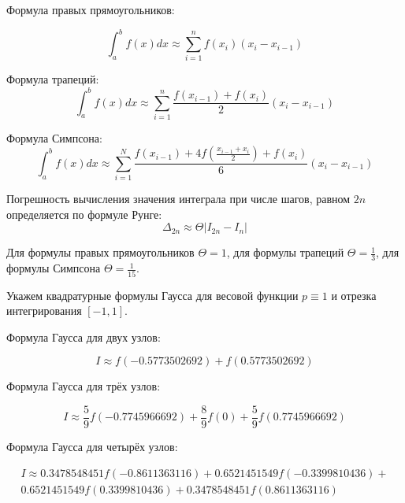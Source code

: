 \documentclass[12pt, a4paper]{article}
\begin{document}
Формула правых прямоугольников:

\begin{equation}
	\int_a^bf(x)dx \approx \sum_{i = 1}^{n} f(x_i) (x_i - x_{i - 1})
	\label{eqn:rect} 
\end{equation}

Формула трапеций:
\begin{equation}
	\int_a^b f(x) dx \approx \sum_{i = 1}^{n} 
		\frac{f(x_{i - 1}) + f(x_{i})}{2}(x_{i} - x_{i - 1})
	\label{eqn:trap}
\end{equation}

Формула Симпсона:
\begin{equation}
	\int_{a}^{b} f(x) dx \approx \sum_{i = 1}^N 
	\frac{f(x_{i - 1}) + 4f(\frac{x_{i - 1} + x_i}{2}) + f(x_i)}{6} (x_i - x_{i - 1})
\end{equation}

Погрешность вычисления значения интеграла при числе шагов, равном $2n$ 
определяется по формуле Рунге:
\begin{equation}
	\Delta_{2n} \approx \Theta |I_{2n} - I_n|
	\label{eqn:runge}
\end{equation}

Для формулы правых прямоугольников $\Theta = 1$, для формулы трапеций $\Theta = \frac{1}{3}$, для формулы
Симпсона $\Theta = \frac{1}{15}$.

Укажем квадратурные формулы Гаусса для весовой функции $p \equiv 1$ и 
отрезка интегрирования $[-1, 1]$.

Формула Гаусса для двух узлов:

\begin{equation}
	I \approx f( -0.5773502692) + f(0.5773502692)
	\label{eq:gauss_2}
\end{equation}

Формула Гаусса для трёх узлов:

\begin{equation}
	I \approx \frac{5}{9} f( -0.7745966692) +
	\frac{8}{9} f(0) +
	 \frac{5}{9} f(0.7745966692)
	\label{eq:gauss_3}
\end{equation}

Формула Гаусса для четырёх узлов:

\begin{multline}
	I \approx 0.3478548451 f( -0.8611363116) +
	0.6521451549 f( -0.3399810436) + \\
	0.6521451549 f(0.3399810436) +
	0.3478548451 f(0.8611363116)
	\label{eq:gauss_4}
\end{multline}
\end{document}
